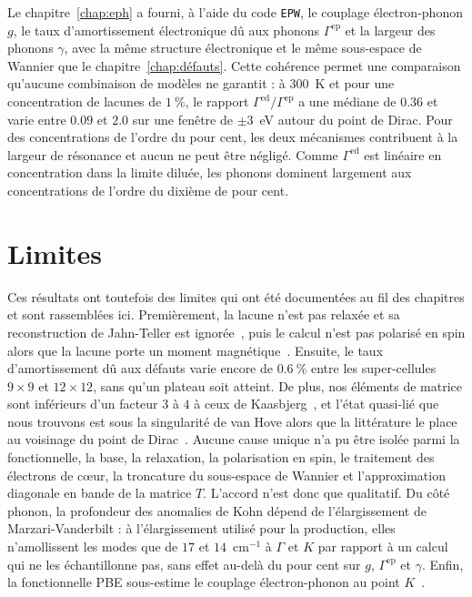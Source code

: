 Le chapitre~\ref{chap:eph} a fourni, à l'aide du code \texttt{EPW}, le couplage électron-phonon $g$, le taux d'amortissement électronique dû aux phonons $\Gamma^\text{ep}$ et la largeur des phonons $\gamma$, avec la même structure électronique et le même sous-espace de Wannier que le chapitre~\ref{chap:défauts}. Cette cohérence permet une comparaison qu'aucune combinaison de modèles ne garantit : à $300$~K et pour une concentration de lacunes de $1~\%$, le rapport $\Gamma^\text{ed}/\Gamma^\text{ep}$ a une médiane de $0.36$ et varie entre $0.09$ et $2.0$ sur une fenêtre de $\pm 3$~eV autour du point de Dirac. Pour des concentrations de l'ordre du pour cent, les deux mécanismes contribuent à la largeur de résonance et aucun ne peut être négligé. Comme $\Gamma^\text{ed}$ est linéaire en concentration dans la limite diluée, les phonons dominent largement aux concentrations de l'ordre du dixième de pour cent.

\section{Limites}

Ces résultats ont toutefois des limites qui ont été documentées au fil des chapitres et sont rassemblées ici. Premièrement, la lacune n'est pas relaxée et sa reconstruction de Jahn-Teller est ignorée~\cite{el-barbaryStructureEnergeticsVacancy2003}, puis le calcul n'est pas polarisé en spin alors que la lacune porte un moment magnétique~\cite{yazyevDefectinducedMagnetismGraphene2007}. Ensuite, le taux d'amortissement dû aux défauts varie encore de $0.6~\%$ entre les super-cellules $9\times 9$ et $12\times 12$, sans qu'un plateau soit atteint. De plus, nos éléments de matrice sont inférieurs d'un facteur $3$ à $4$ à ceux de Kaasbjerg~\cite{kaasbjergAtomisticMatrixTheory2020}, et l'état quasi-lié que nous trouvons est sous la singularité de van Hove alors que la littérature le place au voisinage du point de Dirac~\cite{kaasbjergAtomisticMatrixTheory2020,pereiraDisorderInducedLocalized2006}. Aucune cause unique n'a pu être isolée parmi la fonctionnelle, la base, la relaxation, la polarisation en spin, le traitement des électrons de c\oe ur, la troncature du sous-espace de Wannier et l'approximation diagonale en bande de la matrice $T$. L'accord n'est donc que qualitatif. Du côté phonon, la profondeur des anomalies de Kohn dépend de l'élargissement de Marzari-Vanderbilt : à l'élargissement utilisé pour la production, elles n'amollissent les modes que de $17$ et $14$~cm$^{-1}$ à $\Gamma$ et $K$ par rapport à un calcul qui ne les échantillonne pas, sans effet au-delà du pour cent sur $g$, $\Gamma^\text{ep}$ et $\gamma$. Enfin, la fonctionnelle PBE sous-estime le couplage électron-phonon au point $K$~\cite{lazzeriImpactElectronelectronCorrelation2008}.

